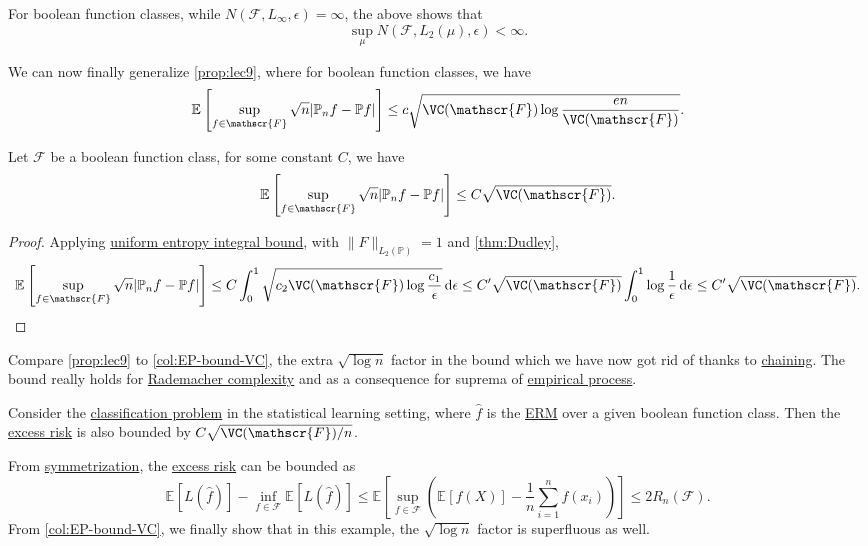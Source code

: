 \begin{remark}
	For boolean function classes, while \(N(\mathscr{F} , L_\infty , \epsilon ) = \infty \), the above shows that
	\[
		\sup _\mu N(\mathscr{F} , L_2(\mu ), \epsilon ) < \infty .
	\]
\end{remark}

We can now finally generalize \autoref{prop:lec9}, where for boolean function classes, we have
\[
	\mathbb{E}_{}\left[\sup _{f\in \mathscr{F} } \sqrt{n} \vert \mathbb{P} _n f - \mathbb{P} f \vert  \right]
	\leq c \sqrt{\VC(\mathscr{F} )\log \frac{en}{\VC(\mathscr{F} )}} .
\]

\begin{corollary}\label{col:EP-bound-VC}
	Let \(\mathscr{F} \) be a boolean function class, for some constant \(C\), we have
	\[
		\mathbb{E}_{}\left[\sup _{f\in \mathscr{F} } \sqrt{n} \vert \mathbb{P} _n f - \mathbb{P} f \vert \right]
		\leq C \sqrt{\VC(\mathscr{F} )} .
	\]
\end{corollary}
\begin{proof}
	Applying \hyperref[thm:uniform-entropy-integral-bound]{uniform entropy integral bound}, with \(\lVert F \rVert _{L_2(\mathbb{P} )} = 1\) and \autoref{thm:Dudley},
	\[
		\mathbb{E}_{}\left[\sup _{f\in \mathscr{F} } \sqrt{n} \vert \mathbb{P} _n f - \mathbb{P} f \vert \right]
		\leq C \int_{0}^{1} \sqrt{c_2 \VC(\mathscr{F} ) \log \frac{c_1}{\epsilon }}  \,\mathrm{d}\epsilon
		\leq C^{\prime} \sqrt{\VC(\mathscr{F} )} \int_{0}^{1} \log \frac{1}{\epsilon } \,\mathrm{d}\epsilon
		\leq C^{\prime} \sqrt{\VC(\mathscr{F} )} .
	\]
\end{proof}

\begin{remark}
	Compare \autoref{prop:lec9} to \autoref{col:EP-bound-VC}, the extra \(\sqrt{\log n}\) factor in the bound which we have now got rid of thanks to \hyperref[note:chaining]{chaining}. The bound really holds for \hyperref[def:Rademacher-complexity]{Rademacher complexity} and as a consequence for suprema of \hyperref[def:EP]{empirical process}.
\end{remark}

\begin{note}
	Consider the \hyperref[eg:1D-classification-thresholds]{classification problem} in the statistical learning setting, where \(\hat{f} \) is the \hyperref[prb:ERM]{ERM} over a given boolean function class. Then the \hyperref[def:excess-risk]{excess risk} is also bounded by \(C \sqrt{\VC(\mathscr{F} ) / n} \).
\end{note}
\begin{explanation}
	From \hyperref[lma:symmetrization]{symmetrization}, the \hyperref[def:excess-risk]{excess risk} can be bounded as
	\[
		\mathbb{E}_{}\left[L(\hat{f} ) \right] - \inf _{f\in \mathscr{F} } \mathbb{E}_{}\left[L(\hat{f} ) \right]
		\leq \mathbb{E}_{}\left[\sup _{f\in \mathscr{F} } \left( \mathbb{E}_{}\left[f(X) \right] - \frac{1}{n}\sum_{i=1}^{n} f(x_i) \right) \right]
		\leq 2R_n(\mathscr{F} ).
	\]
	From \autoref{col:EP-bound-VC}, we finally show that in this example, the \(\sqrt{\log n} \) factor is superfluous as well.
\end{explanation}

